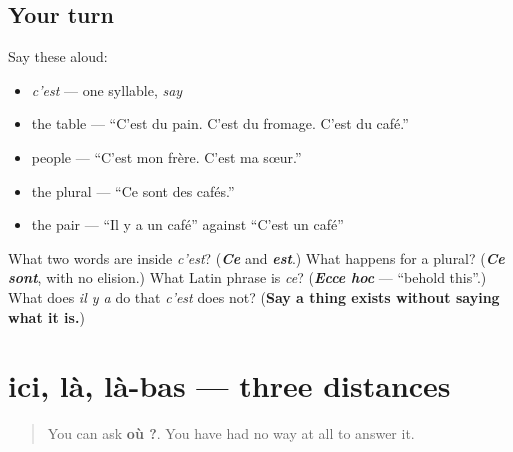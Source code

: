 \subsection*{Your turn}
Say these aloud:

\begin{itemize}
\raggedright
  \item \emph{c'est} — one syllable, \emph{say}
  \item the table — \textquotedblleft{}C'est du pain. C'est du fromage. C'est du café.\textquotedblright{}
  \item people — \textquotedblleft{}C'est mon frère. C'est ma sœur.\textquotedblright{}
  \item the plural — \textquotedblleft{}Ce sont des cafés.\textquotedblright{}
  \item the pair — \textquotedblleft{}Il y a un café\textquotedblright{} against \textquotedblleft{}C'est un café\textquotedblright{}
\end{itemize}

\begin{tcolorbox}[breakable,colback=teal!4,colframe=teal!35!black,title={Before you move on}]
What two words are inside \emph{c'est}? (\emph{\textbf{Ce}} and \emph{\textbf{est}}.) What happens for a plural? (\emph{\textbf{Ce sont}}, with no elision.) What Latin phrase is \emph{ce}? (\emph{\textbf{Ecce hoc}} — \textquotedblleft{}behold this\textquotedblright{}.) What does \emph{il y a} do that \emph{c'est} does not? (\textbf{Say a thing exists without saying what it is.})
\end{tcolorbox}
\section[ici, là, là-bas]{ici, là, là-bas — three distances}

\label{lesson:FR-C34-ici-la}



\begin{quote}
You can ask \textbf{où ?}. You have had no way at all to answer it.
\end{quote}

